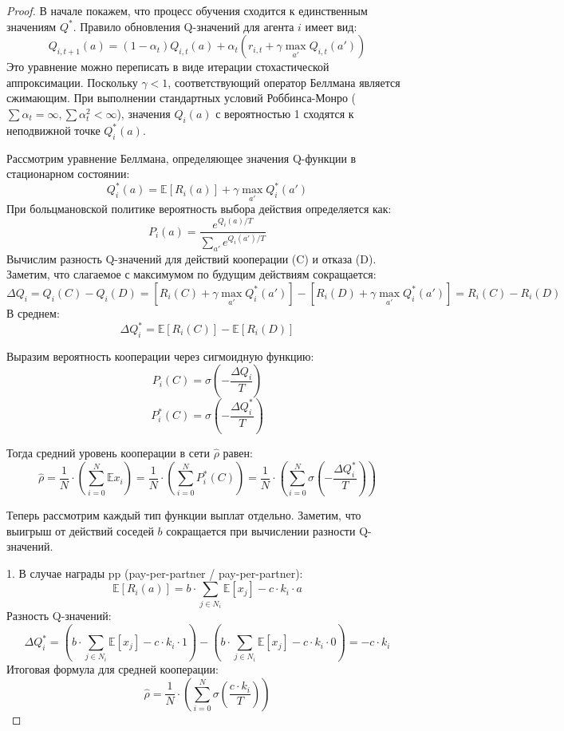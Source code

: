 \documentclass[a4paper, fontsize=14pt]{article}
\theoremstyle{plain}
\theoremstyle{definition}
\begin{document}
\begin{proof}
    В начале покажем, что процесс обучения сходится к единственным значениям $Q^*$.
    Правило обновления Q-значений для агента $i$ имеет вид:
    $$ Q_{i, t+1}(a) = (1-\alpha_t) Q_{i, t}(a) + \alpha_t \left( r_{i, t} + \gamma \max_{a'} Q_{i, t}(a') \right) $$
    Это уравнение можно переписать в виде итерации стохастической аппроксимации. Поскольку $\gamma < 1$, соответствующий оператор Беллмана является сжимающим. При выполнении стандартных условий Роббинса-Монро ($\sum \alpha_t = \infty, \sum \alpha_t^2 < \infty$), значения $Q_i(a)$ с вероятностью 1 сходятся к неподвижной точке $Q_i^*(a)$.

    Рассмотрим уравнение Беллмана, определяющее значения Q-функции в стационарном состоянии:
    $$ Q_i^*(a) = \mathbb{E}[R_i(a)] + \gamma \max_{a'} Q_i^*(a') $$
    При больцмановской политике вероятность выбора действия определяется как:
    $$ P_i(a) = \frac{e^{Q_i(a)/T}}{\sum_{a'} e^{Q_i(a')/T}} $$
    Вычислим разность Q-значений для действий кооперации (C) и отказа (D). Заметим, что слагаемое с максимумом по будущим действиям сокращается:
    $$ \Delta Q_i = Q_i(C) - Q_i(D) = \left[R_i(C) + \gamma \max_{a'} Q_i^*(a')\right] - \left[R_i(D) + \gamma \max_{a'} Q_i^*(a')\right] = R_i(C) - R_i(D)$$
    В среднем:
    $$ \Delta Q_i^* =  \mathbb{E}[R_i(C)] - \mathbb{E}[R_i(D)]$$
    
    Выразим вероятность кооперации через сигмоидную функцию:
    $$ P_i(C) = \sigma\left(-\frac{\Delta Q_i}{T}\right)$$
    $$ P_i^*(C) = \sigma\left(-\frac{\Delta Q_i^*}{T}\right)$$
    
    Тогда средний уровень кооперации в сети $\hat{\rho}$ равен:
    $$\hat{\rho} = \frac{1}{N} \cdot \left( \sum_{i=0}^N\mathbb{E}x_i\right) = \frac{1}{N} \cdot \left( \sum_{i=0}^N P_i^*(C)\right) = \frac{1}{N} \cdot \left( \sum_{i=0}^N \sigma\left(-\frac{\Delta Q_i^*}{T}\right)\right)$$
    
    Теперь рассмотрим каждый тип функции выплат отдельно. Заметим, что выигрыш от действий соседей $b$ сокращается при вычислении разности Q-значений.
    
    1. В случае награды pp (pay-per-partner / pay-per-partner):
    $$ \mathbb{E}[R_i(a)] = b \cdot \sum_{j \in N_i} \mathbb{E}[x_j] - c \cdot k_i \cdot a $$
    Разность Q-значений:
    $$ \Delta Q_i^* = (b \cdot \sum_{j \in N_i} \mathbb{E}[x_j] - c \cdot k_i \cdot 1)  - (b \cdot \sum_{j \in N_i} \mathbb{E}[x_j] - c \cdot k_i \cdot 0) = - c \cdot k_i $$
    Итоговая формула для средней кооперации:
    $$\hat{\rho} = \frac{1}{N} \cdot \left( \sum_{i=0}^N \sigma\left(\frac{c \cdot k_i}{T} \right)\right)$$ 
    

\end{proof}
\end{document}
